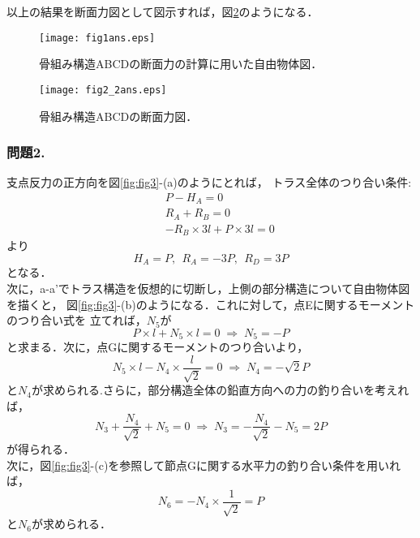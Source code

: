 \documentclass[10pt,a4j]{jarticle}
\begin{document}
以上の結果を断面力図として図示すれば，図\ref{fig:fig2}のようになる．
\begin{figure}[h]
	\begin{center}
	\texttt{[image: fig1ans.eps]} 
	\end{center}
	\caption{骨組み構造ABCDの断面力の計算に用いた自由物体図．} 
	\label{fig:fig1}
\end{figure}
\begin{figure}[h]
	\begin{center}
	\texttt{[image: fig2\_2ans.eps]} 
	\end{center}
	\caption{骨組み構造ABCDの断面力図．} 
	\label{fig:fig2}
\end{figure}
\subsubsection*{問題2.}
支点反力の正方向を図\ref{fig:fig3}-(a)のようにとれば，
トラス全体のつり合い条件:
\begin{eqnarray}
	&& P-H_A=0  \\
	&& R_A+R_B=0 \\  
	&& -R_B\times 3l + P \times 3l=0 
\end{eqnarray}
より
\begin{equation}
	H_A=P, \ \ 
	R_A=-3P, \ \ 
	R_D=3P
\end{equation}
となる．\\

次に，a-a'でトラス構造を仮想的に切断し，上側の部分構造について自由物体図を描くと，
図\ref{fig:fig3}-(b)のようになる．これに対して，点Eに関するモーメントのつり合い式を
立てれば，$N_5$が
\begin{equation}
	P\times l +N_5\times l=0
	\; \Rightarrow \;
	N_5=-P
\end{equation}
と求まる．次に，点Gに関するモーメントのつり合いより，
\begin{equation}
	N_5\times l -N_4\times \frac{l}{\sqrt{2}}=0
	\; \Rightarrow \;
	N_4=-\sqrt{2}P
\end{equation}
と$N_4$が求められる.さらに，部分構造全体の鉛直方向への力の釣り合いを考えれば，
\begin{equation}
	N_3+\frac{N_4}{\sqrt{2}}+N_5=0 
	\; \Rightarrow \;
	N_3=-\frac{N_4}{\sqrt{2}}-N_5=2P 
\end{equation}
が得られる．\\

次に，図\ref{fig:fig3}-(c)を参照して節点Gに関する水平力の釣り合い条件を用いれば，
\begin{equation}
	N_6=-N_4\times \frac{1}{\sqrt{2}}=P
\end{equation}
と$N_6$が求められる．\\
\end{document}
